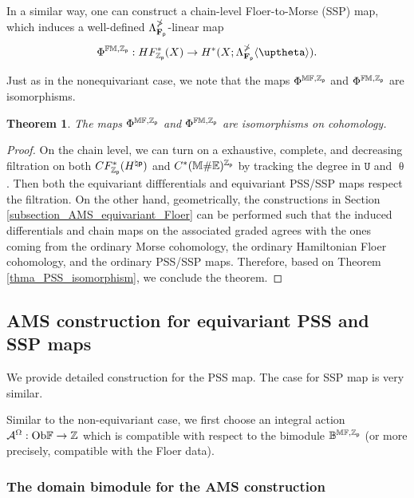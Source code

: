 \documentclass[reqno, 10pt]{amsart}
\numberwithin{equation}{section}
\numberwithin{equation}{section}
\newtheorem{thm}{Theorem}[section]
\theoremstyle{definition}
\theoremstyle{remark}
\newcommand{\beqn}{\begin{equation*}}
\newcommand{\eeqn}{\end{equation*}}
\newcommand{\mb}{\mathbb}
\newcommand{\mc}{\mathcal}
\newcommand{\p}{{\sf p}}
\newcommand{\fp}{{\bf F}_{\sf p}}
\newcommand{\zp}{{{\mb Z}_{\sf p}}}
\newcommand{\tu}{\mathtt{U}}
\begin{document}
In a similar way, one can construct a chain-level Floer-to-Morse (SSP) map, which induces a well-defined $\Lambda_{\fp}^{\mb\Pi}$-linear map
\beqn
\Phi^{\mb{FM}, \zp}: HF_{\zp}^*(X) \to H^*(X; \Lambda_{\fp}^{\mb\Pi}\langle \uptheta \rangle).
\eeqn

Just as in the nonequivariant case, we note that the maps $\Phi^{\mb{MF}, \zp}$ and $\Phi^{\mb{FM}, \zp}$ are isomorphisms.

\begin{thm}
The maps $\Phi^{\mb{MF}, \zp}$ and $\Phi^{\mb{FM}, \zp}$ are isomorphisms on cohomology.
\end{thm}

\begin{proof}
On the chain level, we can turn on a exhaustive, complete, and decreasing filtration on both $CF_{\zp}^*( H^{\natural \p})$ and $C^*( \mb{M}\# {\mb E})^{\mb{Z}_\p}$ by tracking the degree in $\tu$ and $\uptheta$. Then both the equivariant diffferentials and equivariant PSS/SSP maps respect the filtration. On the other hand, geometrically, the constructions in Section \ref{subsection_AMS_equivariant_Floer} can be performed such that the induced differentials and chain maps on the associated graded agrees with the ones coming from the ordinary Morse cohomology, the ordinary Hamiltonian Floer cohomology, and the ordinary PSS/SSP maps. Therefore, based on Theorem \ref{thma_PSS_isomorphism}, we conclude the theorem.
\end{proof}







\subsection{AMS construction for equivariant PSS and SSP maps}

We provide detailed construction for the PSS map. The case for SSP map is very similar. 

Similar to the non-equivariant case, we first choose an integral action ${\mc A}^\Omega: {\rm Ob}{\mb F} \to {\mb Z}$ which is compatible with respect to the bimodule ${\mb B}^{\mb{MF}, \zp}$ (or more precisely, compatible with the Floer data). 

\subsubsection{The domain bimodule for the AMS construction}\label{subsubsec:equiv-AMS}
\end{document}
